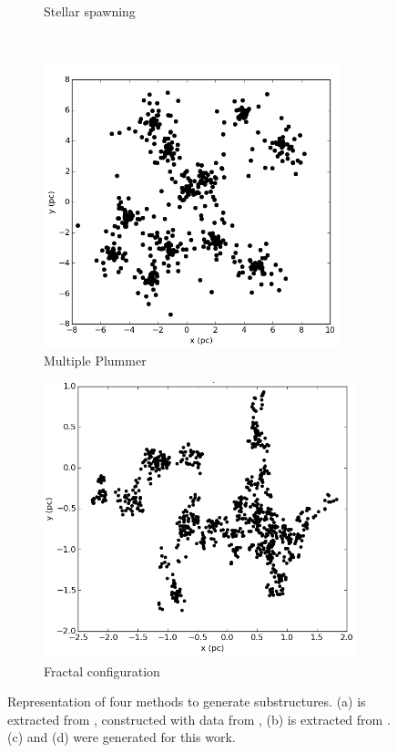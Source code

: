 \begin{figure}
\begin{subfigure}[b]{0.48\textwidth}
        \caption{Stellar spawning}
        \label{Fig:0_substructure_1}
    \end{subfigure}
    \\
    \begin{subfigure}[b]{0.48\textwidth}
        \includegraphics[width=0.95\textwidth]{Figures/0_plummers.png}
        \caption{Multiple Plummer}
        \label{Fig:0_substructure_2}
    \end{subfigure}
    \begin{subfigure}[b]{0.48\textwidth}
        \includegraphics[width=\textwidth]{Figures/0_fractals.png}
        \caption{Fractal configuration}
        \label{Fig:0_substructure_3}
    \end{subfigure}
\caption{Representation of four methods to generate substructures. (a) is extracted from \cite{Kruijssen2012}, constructed with data from \cite{Bonnell2003}, (b) is extracted from \cite{Fujii2015}. (c) and (d) were generated for this work.}
\label{Fig:0_substructures}
\end{figure}


